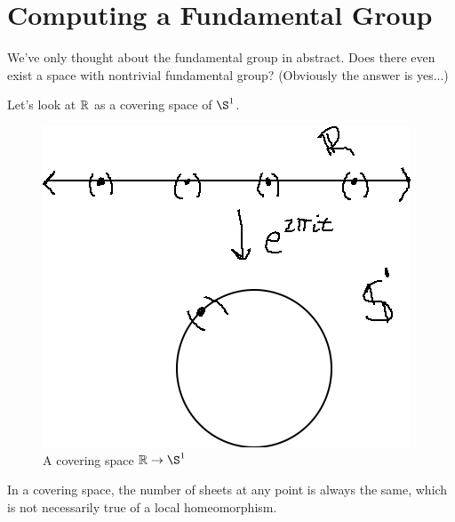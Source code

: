 
\section*{Computing a Fundamental Group}

We've only thought about the fundamental group in abstract.  Does there even exist a space with nontrivial fundamental group? (Obviously the answer is yes...)

Let's look at $\mathbb{R}$ as a covering space of $\S^1$.\\

	\begin{figure}[!htb]
	\centering
	\includegraphics[scale=.5]{images/rs1covsp}
	\caption{A covering space $\R\rightarrow\S^1$}
	\label{fig:r_s1_cov}
\end{figure}

In a covering space, the number of sheets at any point is always the same, which is not necessarily true of a local homeomorphism.



